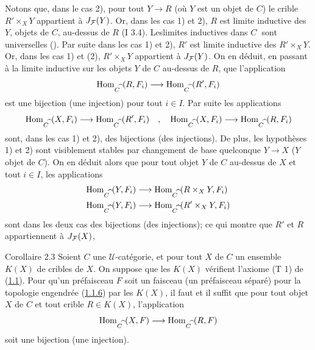 \documentclass[10pt]{../fichiers-configuration-latex/smfart}
\begin{document}
Notons que, dans le cas 2), pour tout $Y\rightarrow R$ (où $Y$ est
un objet de $C$) le crible $R'\times_X Y$ appartient à $J_{{\mathcal F}}(Y)$.
Or, dans les cas 1) et 2), $R$ est limite inductive des $Y$, objets
de $C$, au-dessus de $R$ (I 3.4). Les\pageoriginale limites
inductives dans $C^{\widehat{\phantom{,}}}$ sont universelles
(). Par suite dans les cas 1) et 2), $R'$ est limite
inductive des $R'\times_X Y$. Or, dans les cas 1) et (2),
$R'\times_X Y$ appartient à $J_{{\mathcal F}}(Y)$. On en déduit, en passant à
la limite inductive sur les objets $Y$ de $C$ au-dessus de $R$, que
l'application
$$
\operatorname{Hom}_{C^{\widehat{\phantom{,}}}}(R,F_i)\longrightarrow
\operatorname{Hom}_{C^{\widehat{\phantom{,}}}}(R',F_i)
$$
est une bijection (\resp une injection) pour tout $i\in I$. Par
suite les applications
$$
\operatorname{Hom}_{C^{\widehat{\phantom{,}}}}(X,F_i)\longrightarrow
\operatorname{Hom}_{C^{\widehat{\phantom{,}}}}(R',F_i)\quad,\quad
\operatorname{Hom}_{C^{\widehat{\phantom{,}}}}(X,F_i)\longrightarrow
\operatorname{Hom}_{C^{\widehat{\phantom{,}}}}(R,F_i)
$$
sont, dans les cas 1) et 2), des bijections (\resp des injections).
De plus, les hypothèses 1) et 2) sont visiblement stables par
changement de base quelconque $Y\rightarrow X$ ($Y$ objet de $C$).
On en déduit alors que pour tout objet $Y$ de $C$ au-dessus de $X$
et tout $i\in I$, les applications
\begin{align*}
\operatorname{Hom}_{C^{\widehat{\phantom{,}}}}(Y,F_i)&\longrightarrow
\operatorname{Hom}_{C^{\widehat{\phantom{,}}}}(R\times_X Y, F_i)\\
\operatorname{Hom}_{C^{\widehat{\phantom{,}}}}(Y,F_i)&\longrightarrow
\operatorname{Hom}_{C^{\widehat{\phantom{,}}}}(R'\times_X Y, F_i)
\end{align*}
sont dans les deux cas des bijections (\resp des injections); ce qui
montre que $R'$ et $R$ appartiennent à $J_{{\mathcal F}}(X)$, \cqfd

\begin{enonce*}{Corollaire 2.3}
Soient $C$ une $𝒰$-catégorie, et pour tout $X$ de $C$ un
ensemble $K(X)$ de cribles de $X$. On suppose que les $K(X)$
vérifient l'axiome {\rm (T 1)} de {\rm(\hyperref[II.def1.1]{1.1})}. Pour
qu'un préfaisceau $F$ soit un faisceau (\resp un préfaisceau
séparé) pour la topologie engendrée (\hyperref[II.subsubsec1.1.6]{1.1.6})
par les $K(X)$, il faut et il suffit que pour tout objet $X$ de $C$
et tout crible $R\in K(X)$, l'application
$$
\operatorname{Hom}_{C^{\widehat{\phantom{,}}}}(X,F)\longrightarrow
\operatorname{Hom}_{C^{\widehat{\phantom{,}}}}(R,F)
$$
soit une bijection (\resp une injection).
\end{enonce*}
\end{document}
